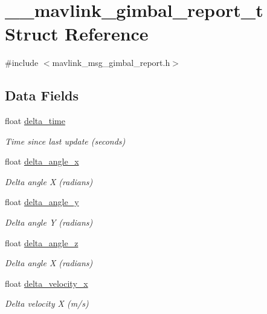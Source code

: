 \hypertarget{struct____mavlink__gimbal__report__t}{\section{\+\_\+\+\_\+mavlink\+\_\+gimbal\+\_\+report\+\_\+t Struct Reference}
\label{struct____mavlink__gimbal__report__t}
}


{\ttfamily \#include $<$mavlink\+\_\+msg\+\_\+gimbal\+\_\+report.\+h$>$}

\subsection*{Data Fields}
\begin{DoxyCompactItemize}
\item 
float \hyperlink{struct____mavlink__gimbal__report__t_a5ad336e46045d5a4d29fd7dce55b32f5}{delta\+\_\+time}
\begin{DoxyCompactList}\small\item\em Time since last update (seconds) \end{DoxyCompactList}\item 
float \hyperlink{struct____mavlink__gimbal__report__t_aeeb9a95199d97bd3527b51bf814e6287}{delta\+\_\+angle\+\_\+x}
\begin{DoxyCompactList}\small\item\em Delta angle X (radians) \end{DoxyCompactList}\item 
float \hyperlink{struct____mavlink__gimbal__report__t_a2db18dacaf81247985159b52a8a03161}{delta\+\_\+angle\+\_\+y}
\begin{DoxyCompactList}\small\item\em Delta angle Y (radians) \end{DoxyCompactList}\item 
float \hyperlink{struct____mavlink__gimbal__report__t_a1ea7cb840e0d5ff0e7c0e1342d2222a4}{delta\+\_\+angle\+\_\+z}
\begin{DoxyCompactList}\small\item\em Delta angle X (radians) \end{DoxyCompactList}\item 
float \hyperlink{struct____mavlink__gimbal__report__t_a25cb957e032031e75745c69dedf0831f}{delta\+\_\+velocity\+\_\+x}
\begin{DoxyCompactList}\small\item\em Delta velocity X (m/s) \end{DoxyCompactList}\item 

\end{DoxyCompactItemize}
